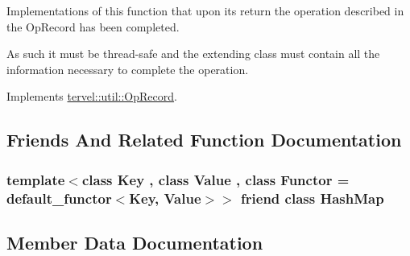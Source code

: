Implementations of this function that upon its return the operation described in the Op\+Record has been completed. 

As such it must be thread-\/safe and the extending class must contain all the information necessary to complete the operation. 

Implements \hyperlink{classtervel_1_1util_1_1_op_record_aa75ab39688a8d4cceb6a1ef0409537c0}{tervel\+::util\+::\+Op\+Record}.



\subsection{Friends And Related Function Documentation}
\hypertarget{classtervel_1_1containers_1_1wf_1_1_hash_map_1_1_force_expand_op_ab6054287e6f409207af3fa16e49046ad}{}
\subsubsection[{Hash\+Map}]{\setlength{\rightskip}{0pt plus 5cm}template$<$class Key , class Value , class Functor  = default\+\_\+functor$<$\+Key, Value$>$$>$ friend class {\bf Hash\+Map}\hspace{0.3cm}{\ttfamily [friend]}}\label{classtervel_1_1containers_1_1wf_1_1_hash_map_1_1_force_expand_op_ab6054287e6f409207af3fa16e49046ad}


\subsection{Member Data Documentation}
\hypertarget{classtervel_1_1containers_1_1wf_1_1_hash_map_1_1_force_expand_op_a089cd031b862f5bafb70882399148174}{}

